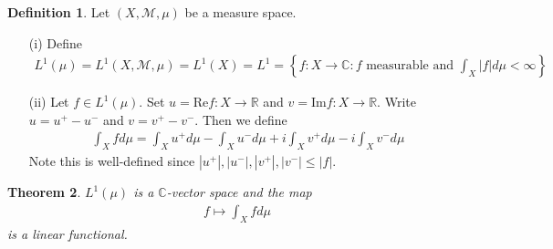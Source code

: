 \documentclass[11pt]{amsart}
\newtheorem{theorem}{Theorem}[section]
\theoremstyle{definition}
\newtheorem{definition}[theorem]{Definition}
\numberwithin{equation}{section}
\begin{document}
\begin{definition}
    Let $(X,\mathcal M,\mu)$ be a measure space.
    \begin{enumerate}
        \item [(i)] Define
        \begin{align*}
            L^1(\mu)=L^1(X,\mathcal M,\mu)=L^1(X)=L^1=\left\{f:X\to\mathbb C:f\text{ measurable and }\int_X|f|d\mu<\infty\right\}
        \end{align*}
        \item [(ii)] Let $f\in L^1(\mu)$. Set $u=\mathrm{Re}f:X\to\mathbb R$ and $v=\mathrm{Im}f:X\to\mathbb R$. Write $u=u^+-u^-$ and $v=v^+-v^-$. Then we define
        \begin{align*}
            \int_Xfd\mu=\int_Xu^+d\mu-\int_Xu^-d\mu+i\int_Xv^+d\mu-i\int_Xv^-d\mu
        \end{align*}
        Note this is well-defined since $|u^+|,|u^-|,|v^+|,|v^-|\le|f|$.
    \end{enumerate}
\end{definition}
\begin{theorem}
    $L^1(\mu)$ is a $\mathbb C$-vector space and the map
    \begin{align*}
        f\mapsto\int_Xfd\mu
    \end{align*}
    is a linear functional.
\end{theorem}
\end{document}
